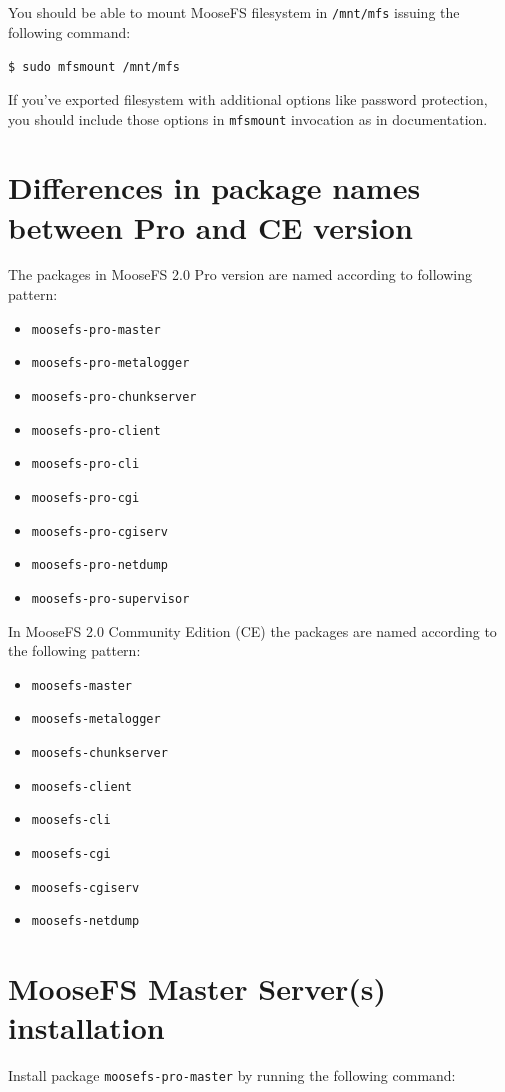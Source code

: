 \documentclass[a4paper,11pt,english]{report}
\def\code#1{\texttt{#1}}
\begin{document}
			You should be able to mount MooseFS filesystem in \code{/mnt/mfs} issuing the following command:
			
			\code{\$ sudo mfsmount /mnt/mfs}
			
			If you've exported filesystem with additional options like password protection, you should include those options in \code{mfsmount} invocation as in documentation.


		\section{Differences in package names between Pro and CE version}
		The packages in MooseFS 2.0 Pro version are named according to following pattern:
		\begin{itemize}
			\item \code{moosefs-pro-master}
			\item \code{moosefs-pro-metalogger}
			\item \code{moosefs-pro-chunkserver}
			\item \code{moosefs-pro-client}
			\item \code{moosefs-pro-cli}
			\item \code{moosefs-pro-cgi}
			\item \code{moosefs-pro-cgiserv}
			\item \code{moosefs-pro-netdump}
			\item \code{moosefs-pro-supervisor}
		\end{itemize}
		
		\bigskip
		In MooseFS 2.0 Community Edition (CE) the packages are named according to the following pattern:
		\begin{itemize}
			\item \code{moosefs-master}
			\item \code{moosefs-metalogger}
			\item \code{moosefs-chunkserver}
			\item \code{moosefs-client}
			\item \code{moosefs-cli}
			\item \code{moosefs-cgi}
			\item \code{moosefs-cgiserv}
			\item \code{moosefs-netdump}
		\end{itemize}
		
		\section{MooseFS Master Server(s) installation}
		Install package \code{moosefs-pro-master} by running the following command:
		
\end{document}
